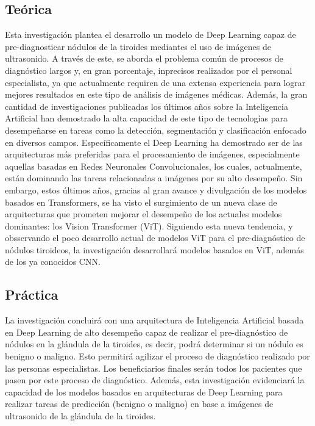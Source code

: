 \subsection{Teórica}
Esta investigación plantea el desarrollo un modelo de Deep Learning capaz de pre-diagnosticar nódulos de la tiroides mediantes el uso de imágenes de ultrasonido. A través de este, se aborda el problema común de procesos de diagnóstico largos y, en gran porcentaje, inprecisos realizados por el personal especialista, ya que actualmente requiren de una extensa experiencia para lograr mejores resultados en este tipo de análisis de imágenes médicas. Además, la gran cantidad de investigaciones publicadas los últimos años sobre la Inteligencia Artificial han demostrado la alta capacidad de este tipo de tecnologías para desempeñarse en tareas como la detección, segmentación y clasificación enfocado en diversos campos. Específicamente el Deep Learning ha demostrado ser de las arquitecturas más preferidas para el procesamiento de imágenes, especialmente aquellas basadas en Redes Neuronales Convolucionales, los cuales, actualmente, están dominando las tareas relacionadas a imágenes por su alto desempeño. Sin embargo, estos últimos años, gracias al gran avance y divulgación de los modelos basados en Transformers, se ha visto el surgimiento de un nueva clase de arquitecturas que prometen mejorar el desempeño de los actuales modelos dominantes: los Vision Transformer (ViT). Siguiendo esta nueva tendencia, y obsservando el poco desarrollo actual de modelos ViT para el pre-diagnóstico de nódulos tiroideos, la investigación desarrollará modelos basados en ViT, además de los ya conocidos CNN.

\subsection{Práctica}
La investigación concluirá con una arquitectura de Inteligencia Artificial basada en Deep Learning de alto desempeño capaz de realizar el pre-diagnóstico de nódulos en la glándula de la tiroides, es decir, podrá determinar si un nódulo es benigno o maligno. Esto permitirá agilizar el proceso de diagnóstico realizado por las personas especialistas. Los beneficiarios finales serán todos los pacientes que pasen por este proceso de diagnóstico. Además, esta investigación evidenciará la capacidad de los modelos basados en arquitecturas de Deep Learning para realizar tareas de predicción (benigno o maligno) en base a imágenes de ultrasonido de la glándula de la tiroides.

